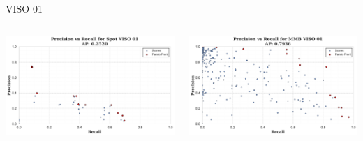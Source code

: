 \begin{frame}{VISO 01}
    \begin{columns}
        \begin{column}{0.5\textwidth}
            \centering
            \includegraphics[width=\textwidth,keepaspectratio]{images/bom/precision_recall_Spot_VISO_01.png}
        \end{column}
        \begin{column}{0.5\textwidth}
            \centering
            \includegraphics[width=\textwidth,keepaspectratio]{images/bom/precision_recall_MMB_VISO_01.png}
        \end{column}
    \end{columns}
\end{frame}

